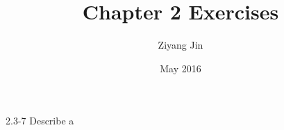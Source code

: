 \documentclass{article}
\title{Chapter 2 Exercises}
\author{Ziyang Jin}
\date{May 2016}
\begin{document}
2.3-7
Describe a \Theta
\end{document}
